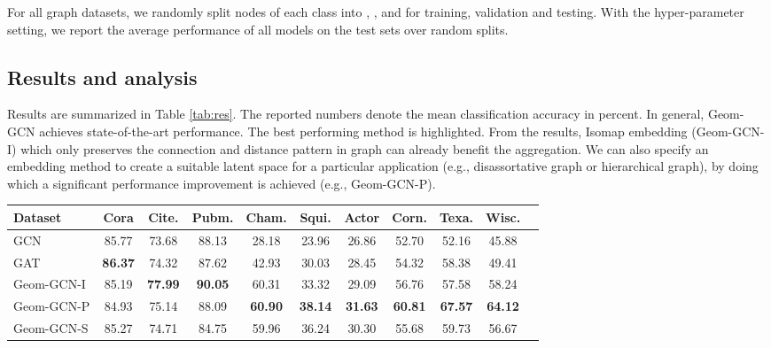 \documentclass{article} \usepackage{iclr2020_conference,times}
\begin{document}
For all graph datasets, we randomly split nodes of each class into , , and  for training, validation and testing.
With the hyper-parameter setting, we report the average performance of all models on the test sets over  random splits.

\vspace{-2mm}
\subsection{Results and analysis}
\vspace{-2mm}
Results are summarized in Table \ref{tab:res}. 
The reported numbers denote the mean classification accuracy in percent.
In general, Geom-GCN achieves state-of-the-art performance.
The best performing method is highlighted.
From the results, Isomap embedding (Geom-GCN-I) which only preserves the connection and distance pattern in graph can already benefit the aggregation.
We can also specify an embedding method to create a suitable latent space for a particular application (e.g., disassortative graph or hierarchical graph), by doing which a significant performance improvement is achieved (e.g., Geom-GCN-P).

\begin{table*}[!hbtp]
    \vspace{-3mm}
    \centering
    \caption{Mean Classification Accuracy (Percent)}
    \vspace{-1.5mm}
    \label{tab:res}
    \begin{tabular}{lcccccccccc}
    \toprule
        \multicolumn{1}{l}{\textbf{Dataset}}  &Cora  &Cite.  &Pubm.  &Cham.  &Squi.  &Actor  &Corn.  &Texa.  &Wisc. \\
        \midrule
        GCN  &85.77  &73.68  &88.13  &28.18  &23.96  &26.86  &52.70  &52.16  &45.88 \\
        GAT  &\textbf{86.37} &74.32  &87.62  &42.93  &30.03  &28.45  &54.32  &58.38  &49.41 \\
        \midrule
        Geom-GCN-I  &85.19  &\textbf{77.99}  &\textbf{90.05}  &60.31  &33.32  &29.09  &56.76  &57.58  &58.24 \\
        Geom-GCN-P  &84.93  &75.14  &88.09  &\textbf{60.90}  &\textbf{38.14}  &\textbf{31.63}  &\textbf{60.81}  &\textbf{67.57}  &\textbf{64.12} \\
        Geom-GCN-S  &85.27  &74.71  &84.75  &59.96  &36.24  &30.30  &55.68  &59.73  &56.67 \\
\bottomrule
\end{tabular}
\end{table*}
\end{document}
